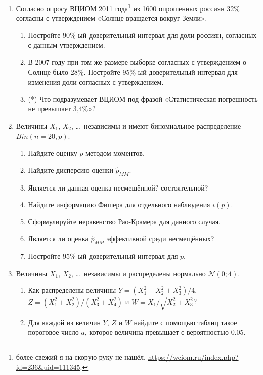 \documentclass[12pt, a4paper]{article}\usepackage[]{graphicx}\usepackage[]{color}
\newcommand{\cN}{\mathcal{N}}
\begin{document}
\begin{enumerate}
\item  Согласно опросу ВЦИОМ 2011 года\footnote{более свежий я на скорую руку не нашёл, \url{https://wciom.ru/index.php?id=236&uid=111345}.} из 1600 опрошенных россиян 32\% согласны с утверждением «Солнце вращается вокруг Земли».

\begin{enumerate}
\item Постройте 90\%-ый доверительный интервал для доли россиян, согласных с данным утверждением.
\item В 2007 году при том же размере выборке согласных с утверждением о Солнце было 28\%. Постройте 95\%-ый доверительный интервал для изменения доли согласных с утверждением.
\item (*) Что подразумевает ВЦИОМ под фразой «Статистическая погрешность не превышает 3,4\%»?
\end{enumerate}

\item Величины $X_1$, $X_2$, \ldots~независимы и имеют биномиальное распределение $Bin(n=20, p)$.
\begin{enumerate}
\item Найдите оценку $p$ методом моментов.
\item Найдите дисперсию оценки $\hat p_{MM}$.
\item Является ли данная оценка несмещённой? состоятельной?
\item Найдите информацию Фишера для отдельного наблюдения $i(p)$.
\item Сформулируйте неравенство Рао-Крамера для данного случая.
\item Является ли оценка $\hat p_{MM}$ эффективной среди несмещённых?
\item Постройте 95\%-ый доверительный интервал для $p$.
\end{enumerate}

\item Величины $X_1$, $X_2$, \ldots~независимы и распределены нормально $\cN(0; 4)$.
\begin{enumerate}
  \item Как распределены величины $Y = (X_1^2 + X_2^2 + X_3^2)/4$, $Z = (X_1^2 + X_2^2)/(X_3^2 + X_4^2)$ и $W = X_1 / \sqrt{X_2^2 + X_3^2}$?
  \item Для каждой из величин $Y$, $Z$ и $W$ найдите с помощью таблиц такое пороговое число $a$, которое величина превышает с вероятностью $0.05$.
\end{enumerate}


\end{enumerate}
\end{document}
